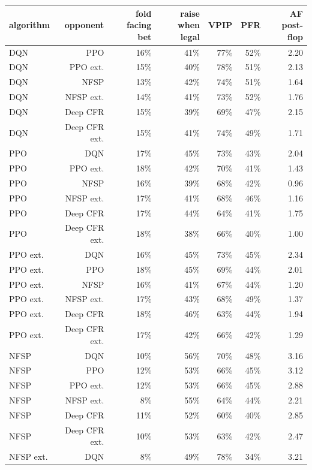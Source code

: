 \begin{tabular}{lrrrrrr}
\toprule
algorithm & opponent & fold facing bet & raise when legal & VPIP & PFR & AF post-flop \\
\midrule
DQN & PPO & 16\% & 41\% & 77\% & 52\% & 2.20 \\
DQN & PPO ext. & 15\% & 40\% & 78\% & 51\% & 2.13 \\
DQN & NFSP & 13\% & 42\% & 74\% & 51\% & 1.64 \\
DQN & NFSP ext. & 14\% & 41\% & 73\% & 52\% & 1.76 \\
DQN & Deep CFR & 15\% & 39\% & 69\% & 47\% & 2.15 \\
DQN & Deep CFR ext. & 15\% & 41\% & 74\% & 49\% & 1.71 \\
PPO & DQN & 17\% & 45\% & 73\% & 43\% & 2.04 \\
PPO & PPO ext. & 18\% & 42\% & 70\% & 41\% & 1.43 \\
PPO & NFSP & 16\% & 39\% & 68\% & 42\% & 0.96 \\
PPO & NFSP ext. & 17\% & 41\% & 68\% & 46\% & 1.16 \\
PPO & Deep CFR & 17\% & 44\% & 64\% & 41\% & 1.75 \\
PPO & Deep CFR ext. & 18\% & 38\% & 66\% & 40\% & 1.00 \\
PPO ext. & DQN & 16\% & 45\% & 73\% & 45\% & 2.34 \\
PPO ext. & PPO & 18\% & 45\% & 69\% & 44\% & 2.01 \\
PPO ext. & NFSP & 16\% & 41\% & 67\% & 44\% & 1.20 \\
PPO ext. & NFSP ext. & 17\% & 43\% & 68\% & 49\% & 1.37 \\
PPO ext. & Deep CFR & 18\% & 46\% & 63\% & 44\% & 1.94 \\
PPO ext. & Deep CFR ext. & 17\% & 42\% & 66\% & 42\% & 1.29 \\
NFSP & DQN & 10\% & 56\% & 70\% & 48\% & 3.16 \\
NFSP & PPO & 12\% & 53\% & 66\% & 45\% & 3.12 \\
NFSP & PPO ext. & 12\% & 53\% & 66\% & 45\% & 2.88 \\
NFSP & NFSP ext. & 8\% & 55\% & 64\% & 44\% & 2.21 \\
NFSP & Deep CFR & 11\% & 52\% & 60\% & 40\% & 2.85 \\
NFSP & Deep CFR ext. & 10\% & 53\% & 63\% & 42\% & 2.47 \\
NFSP ext. & DQN & 8\% & 49\% & 78\% & 34\% & 3.21 \\

\end{tabular}

